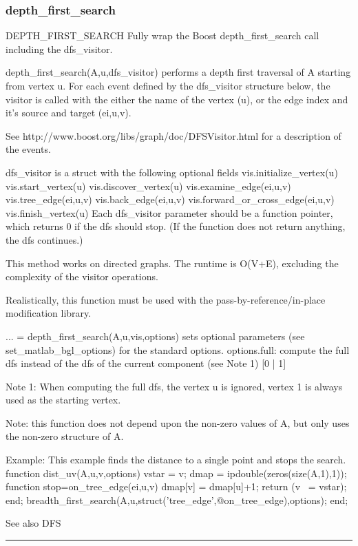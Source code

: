 \subsubsection*{depth\_first\_search}
\begin{mcode}
  DEPTH_FIRST_SEARCH Fully wrap the Boost depth_first_search call
  including the dfs_visitor.
 
  depth_first_search(A,u,dfs_visitor) performs a depth first traversal 
  of A starting from vertex u.  For each event defined by the dfs_visitor 
  structure below, the visitor is called with the either the name of the 
  vertex (u), or the edge index and it's source and target (ei,u,v).  
 
  See http://www.boost.org/libs/graph/doc/DFSVisitor.html for a description
  of the events.
  
  dfs_visitor is a struct with the following optional fields
     vis.initialize_vertex(u)
     vis.start_vertex(u)
     vis.discover_vertex(u)
     vis.examine_edge(ei,u,v)
     vis.tree_edge(ei,u,v)
     vis.back_edge(ei,u,v)
     vis.forward_or_cross_edge(ei,u,v)
     vis.finish_vertex(u)
  Each dfs_visitor parameter should be a function pointer, which returns 0
  if the dfs should stop.  (If the function does not return anything, the
  dfs continues.)
 
  This method works on directed graphs.
  The runtime is O(V+E), excluding the complexity of the visitor
  operations.
 
  Realistically, this function must be used with the
  pass-by-reference/in-place modification library.  
 
  ... = depth_first_search(A,u,vis,options) sets optional parameters (see 
  set_matlab_bgl_options) for the standard options.
    options.full: compute the full dfs instead of the dfs of
       the current component (see Note 1) [{0} | 1]
 
  Note 1: When computing the full dfs, the vertex u is ignored, vertex 1 is
  always used as the starting vertex.  
 
  Note: this function does not depend upon the non-zero values of A, but
  only uses the non-zero structure of A.
 
  Example:
    This example finds the distance to a single point and stops the search.
    function dist_uv(A,u,v,options)
      vstar = v;
      dmap = ipdouble(zeros(size(A,1),1));
      function stop=on_tree_edge(ei,u,v)
        dmap[v] = dmap[u]+1;
        return (v ~= vstar);
      end;
      breadth_first_search(A,u,struct('tree_edge',@on_tree_edge),options);
    end;
 
  See also DFS
\end{mcode}
\newpage
\hrule
